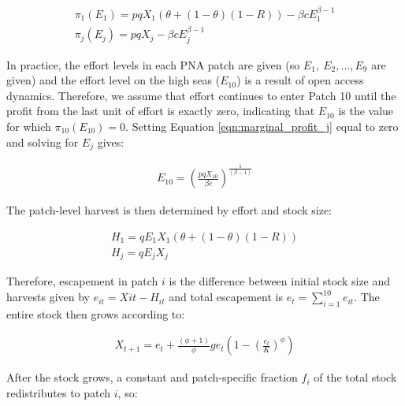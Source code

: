 \documentclass[9p,twocolumn,twoside,lineno]{pnas-new}
\begin{document}
\begin{scriptsize}
\begin{figure}[H]	
	\begin{align}
	\pi_1(E_1) = pqX_1(\theta + (1 - \theta)(1 - R)) - \beta cE_1^{\beta-1}
	\label{eqn:marginal_profit_1}
	\\
	\pi_j(E_j) = pqX_j - \beta cE_j^{\beta-1}
	\label{eqn:marginal_profit_j}
	\end{align}
\end{figure}

In practice, the effort levels in each PNA patch are given (so $E_{1},\ E_{2},...,E_{9}$ are given) and the
effort level on the high seas ($E_{10}$) is a result of open access dynamics. Therefore, we assume that effort continues to enter Patch 10 until the profit from the last unit of effort is exactly zero, indicating that $E_{10}$ is the value for which $\pi_{10}(E_{10})  = 0$. Setting Equation \ref{eqn:marginal_profit_j} equal to zero and solving for $E_j$ gives:

\begin{figure}[H]	
	\begin{align}
	E_{10} = \left(\frac{pqX_{10}}{\beta c}\right)^{\frac{1}{(\beta - 1)}}
	\label{eqn:effort_hs}
	\end{align}
\end{figure}

The patch-level harvest is then determined by effort and stock size:

\begin{figure}[H]	
	\begin{align}
	H_1 = qE_1X_1 (\theta + (1 - \theta)(1 - R))
	\label{eqn:harvest_1}
	\\
	H_j = qE_jX_j
	\label{eqn:harvest_j}
	\end{align}
\end{figure}

Therefore, escapement in patch $i$ is the difference between initial stock size and harvests given by $e_{it} = X{it} - H_{it}$ and total escapement is $e_t=\sum_{i=1}^{10}e_{it}$. The entire stock then grows according to:

\begin{figure}[H]	
	\begin{align}
	X_{t+1} = e_t + \frac{(\phi + 1)}{\phi}ge_t\left(1 - \left(\frac{e_t}{K}\right) ^{\phi}\right)
	\label{eqn:grow}
	\end{align}
\end{figure}

After the stock grows, a constant and patch-specific fraction $f_i$ of the total stock redistributes to patch $i$, so:


\end{scriptsize}
\end{document}
